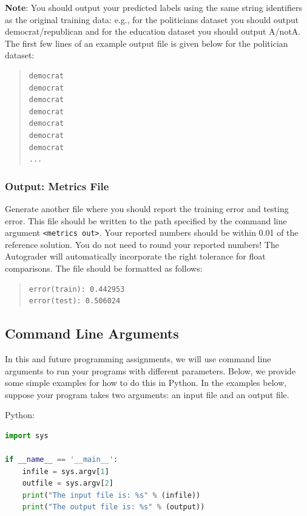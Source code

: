 \documentclass[11pt,addpoints,answers]{exam}
\begin{document}
\textbf{Note}: You should output your predicted labels using the same string identifiers as the original training data: e.g., for the politicians dataset you should output democrat/republican and for the education dataset you should output A/notA.
%
The first few lines of an example output file is given below for the politician dataset:
\begin{quote}
\begin{verbatim}
democrat
democrat
democrat
democrat
democrat
democrat
democrat
...
\end{verbatim}
\end{quote}

\subsubsection{Output: Metrics File}
\label{sec:metrics}

Generate another file where you should report the training error and testing error. This file should be written to the path specified by the command line argument \lstinline{<metrics out>}. Your reported numbers should be within 0.01 of the reference solution. You do not need to round your reported numbers! The Autograder will automatically incorporate the right tolerance for float comparisons. The file should be formatted as follows:

\begin{quote}
\begin{verbatim}
error(train): 0.442953
error(test): 0.506024
\end{verbatim}
\end{quote}

\subsection{Command Line Arguments}

In this and future programming assignments, we will use command line arguments to run your programs with different parameters. Below, we provide some simple examples for how to do this in Python. In the examples below, suppose your program takes two arguments: an input file and an output file.

Python:
\begin{lstlisting}[language=Python]
import sys

if __name__ == '__main__':
    infile = sys.argv[1]
    outfile = sys.argv[2]
    print("The input file is: %s" % (infile))
    print("The output file is: %s" % (output))
\end{lstlisting}
\end{document}
